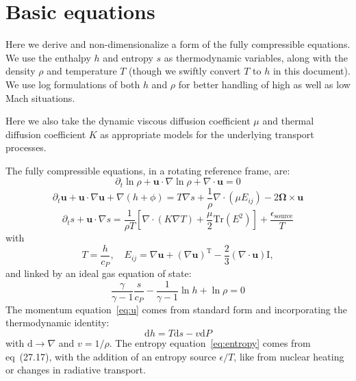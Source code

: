 \documentclass{aastex62}
\newcommand{\del}{\nabla}
\renewcommand{\vec}{\boldsymbol}
\begin{document}
\section{Basic equations}
Here we derive and non-dimensionalize a form of the fully compressible equations.  We use the enthalpy $h$ and entropy $s$ as thermodynamic variables, along with the density $\rho$ and temperature $T$ (though we swiftly convert $T$ to $h$ in this document).  We use log formulations of both $h$ and $\rho$ for better handling of high as well as low Mach situations.

Here we also take the dynamic viscous diffusion coefficient $\mu$ and thermal diffusion coefficient $K$ as appropriate models for the underlying transport processes.

The fully compressible equations, in a rotating reference frame, are:
\begin{equation}
  \partial_t \ln \rho + \vec{u} \cdot \del \ln \rho + \del \cdot \vec{u} = 0
\end{equation}
\begin{equation}
  \partial_t \vec{u} + \vec{u}\cdot \del \vec{u} + \del (h + \phi) = T\del s + \frac{1}{\rho}\del\cdot (\mu E_{ij}) - 2 \vec{\Omega} \times \vec{u}
  \label{eq:u}
\end{equation}
\begin{equation}
  \partial_t s + \vec{u}\cdot \del s = \frac{1}{\rho T}\left[\del \cdot (K \del T) + \frac{\mu}{2}\mathrm{Tr}(E^2)\right] + \frac{\epsilon_\mathrm{source}}{T}
  \label{eq:entropy}
\end{equation}
with
\begin{equation}
  T = \frac{h}{c_P}, \quad E_{ij} = \del \vec{u} + (\del \vec{u})^\mathrm{T} - \frac{2}{3}(\del\cdot\vec{u})\mathrm{I},
\end{equation}
and linked by an ideal gas equation of state:
\begin{equation}
  \frac{\gamma}{\gamma-1} \frac{s}{c_P} - \frac{1}{\gamma - 1}\ln h + \ln \rho =0
\end{equation}
The momentum equation~\ref{eq:u} comes from standard form and incorporating the thermodynamic identity:
\begin{equation}
  \mathrm{d} h = T \mathrm{d} s - v \mathrm{d} P
\end{equation}
with $\mathrm{d} \rightarrow \del$ and $v = 1/\rho$.
The entropy equation~\ref{eq:entropy} comes from \citep{Mihalas&Mihalas} eq~(27.17), with the addition of an entropy source $\epsilon/T$, like from nuclear heating or changes in radiative transport.
\end{document}
